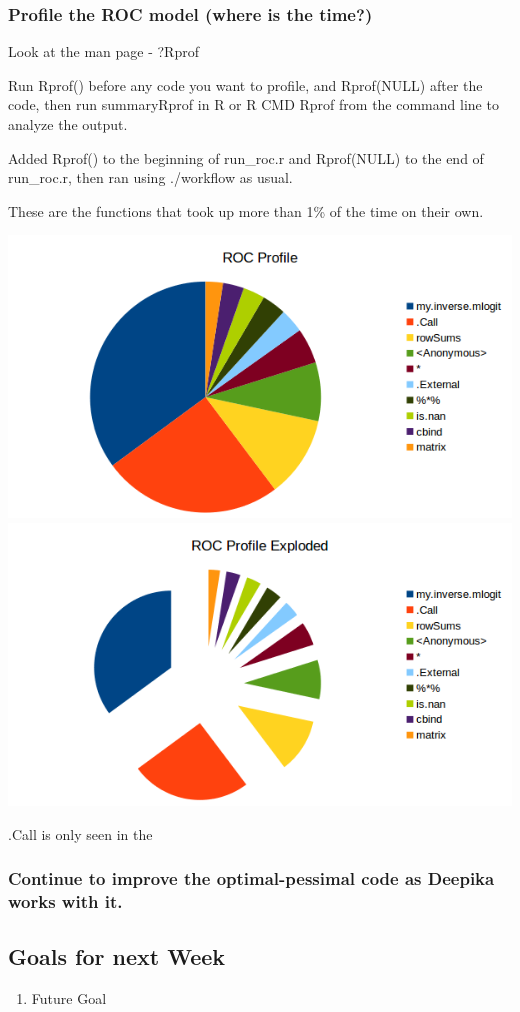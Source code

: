 \documentclass[11pt]{article} %
\begin{document}
\subsubsection{Profile the ROC model (where is the time?)}
Look at the man page - ?Rprof 

Run Rprof() before any code you want to profile, and Rprof(NULL) after the code, then run summaryRprof in R or R CMD Rprof from the command line to analyze the output. 

Added Rprof() to the beginning of run\_roc.r and Rprof(NULL) to the end of run\_roc.r, then ran using ./workflow as usual.

These are the functions that took up more than 1\% of the time on their own.


\includegraphics{data/ROCprofile}
\includegraphics{data/ROCprofilexplode}

.Call is only seen in the 



\subsubsection{Continue to improve the optimal-pessimal code as Deepika works with it.}





\subsection{Goals for next Week}
\begin{enumerate}
\item Future Goal
\end{enumerate}
\end{document}
